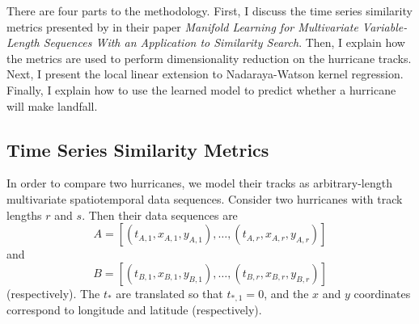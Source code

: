 

\par
There are four parts to the methodology.
First, I discuss the time series similarity metrics presented by \cite{ho2015manifold} in their paper \textit{Manifold Learning for Multivariate Variable-Length Sequences With an Application to Similarity Search}.
Then, I explain how the metrics are used to perform dimensionality reduction on the hurricane tracks.
Next, I present the local linear extension to Nadaraya-Watson kernel regression.
Finally, I explain how to use the learned model to predict whether a hurricane will make landfall.

\subsection{Time Series Similarity Metrics}

\newcommand{\LCSS}{\operatorname{LCSS}}
\newcommand{\SLC}{\operatorname{SLC}}

\par
In order to compare two hurricanes, we model their tracks as arbitrary-length multivariate spatiotemporal data sequences.
Consider two hurricanes with track lengths $r$ and $s$. Then their data sequences are
\[
	A=[(t_{A,1},x_{A,1},y_{A,1}),\ldots,(t_{A,r},x_{A,r},y_{A,r})]
\]
and
\[
	B=[(t_{B,1},x_{B,1},y_{B,1}),\ldots,(t_{B,r},x_{B,r},y_{B,r})]
\]
(respectively).
The $t_{*}$ are translated so that $t_{*,1}=0$, and the $x$ and $y$ coordinates correspond to longitude and latitude (respectively).

